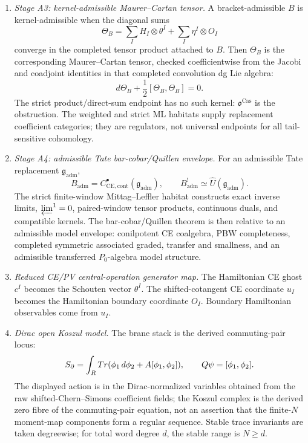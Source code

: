 \begin{enumerate}
  \item \emph{Stage A3: kernel-admissible Maurer--Cartan tensor.}
  A bracket-admissible \(B\) is kernel-admissible when the diagonal sums
  \[
    \Theta_B=\sum_I H_I\otimes\theta^I+\sum_I\eta^I\otimes O_I
  \]
  converge in the completed tensor product attached to \(B\).  Then
  \(\Theta_B\) is the corresponding Maurer--Cartan tensor, checked
  coefficientwise from the Jacobi and coadjoint identities in that
  completed convolution dg Lie algebra:
  \[
    d\Theta_B+\frac12[\Theta_B,\Theta_B]=0.
  \]
  The strict product/direct-sum endpoint has no such kernel:
  \(\mathfrak o^{\mathrm{Cas}}\) is the obstruction.  The weighted and
  strict ML habitats supply replacement coefficient categories; they are
  regulators, not universal endpoints for all tail-sensitive cohomology.

	  \item \emph{Stage A4: admissible Tate bar-cobar/Quillen envelope.}
  For an admissible Tate replacement
  \(\mathfrak g_{\mathrm{adm}}\),
  \[
    B_{\mathrm{adm}}=
    C^\bullet_{\mathrm{CE},\mathrm{cont}}(\mathfrak g_{\mathrm{adm}}),
    \qquad
    B_{\mathrm{adm}}^!\simeq
    \widehat U(\mathfrak g_{\mathrm{adm}}).
  \]
  The strict finite-window Mittag--Leffler habitat constructs exact
  inverse limits, \(\varprojlim^1=0\), paired-window tensor products,
  continuous duals, and compatible kernels.  The bar-cobar/Quillen
  theorem is then relative to an admissible model envelope: conilpotent
  CE coalgebra, PBW completeness, completed symmetric associated
  graded, transfer and smallness, and an admissible transferred
  \(P_0\)-algebra model structure.

  \item \emph{Reduced CE/PV central-operation generator map.}
  The Hamiltonian CE ghost \(c^I\) becomes the Schouten vector
  \(\theta^I\).  The shifted-cotangent CE coordinate \(u_I\) becomes the
  Hamiltonian boundary coordinate \(O_I\).  Boundary Hamiltonian
  observables come from \(u_I\).

  \item \emph{Dirac open Koszul model.}
  The brane stack is the derived commuting-pair locus:
  \[
    S_\partial=\int_{R}Tr
    (\phi_1\,d\phi_2+A[\phi_1,\phi_2]),\qquad
    Q\psi=[\phi_1,\phi_2].
  \]
  The displayed action is in the Dirac-normalized variables obtained from
  the raw shifted-Chern--Simons coefficient fields; the Koszul complex is
  the derived zero fibre of the commuting-pair equation, not an assertion
  that the finite-\(N\) moment-map components form a regular sequence.
  Stable trace invariants are taken degreewise; for total word degree
  \(d\), the stable range is \(N\ge d\).


\end{enumerate}
